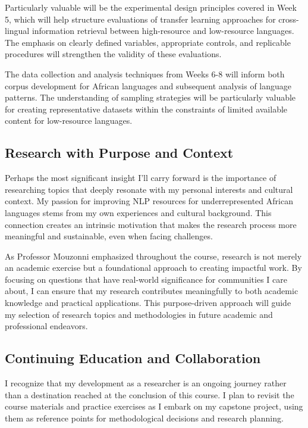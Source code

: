 \documentclass[
]{article}
\begin{document}
Particularly valuable will be the experimental design principles covered
in Week 5, which will help structure evaluations of transfer learning
approaches for cross-lingual information retrieval between high-resource
and low-resource languages. The emphasis on clearly defined variables,
appropriate controls, and replicable procedures will strengthen the
validity of these evaluations.

The data collection and analysis techniques from Weeks 6-8 will inform
both corpus development for African languages and subsequent analysis of
language patterns. The understanding of sampling strategies will be
particularly valuable for creating representative datasets within the
constraints of limited available content for low-resource languages.

\subsection{Research with Purpose and
Context}\label{research-with-purpose-and-context}

Perhaps the most significant insight I'll carry forward is the
importance of researching topics that deeply resonate with my personal
interests and cultural context. My passion for improving NLP resources
for underrepresented African languages stems from my own experiences and
cultural background. This connection creates an intrinsic motivation
that makes the research process more meaningful and sustainable, even
when facing challenges.

As Professor Mouzonni emphasized throughout the course, research is not
merely an academic exercise but a foundational approach to creating
impactful work. By focusing on questions that have real-world
significance for communities I care about, I can ensure that my research
contributes meaningfully to both academic knowledge and practical
applications. This purpose-driven approach will guide my selection of
research topics and methodologies in future academic and professional
endeavors.

\subsection{Continuing Education and
Collaboration}\label{continuing-education-and-collaboration}

I recognize that my development as a researcher is an ongoing journey
rather than a destination reached at the conclusion of this course. I
plan to revisit the course materials and practice exercises as I embark
on my capstone project, using them as reference points for
methodological decisions and research planning.
\end{document}
